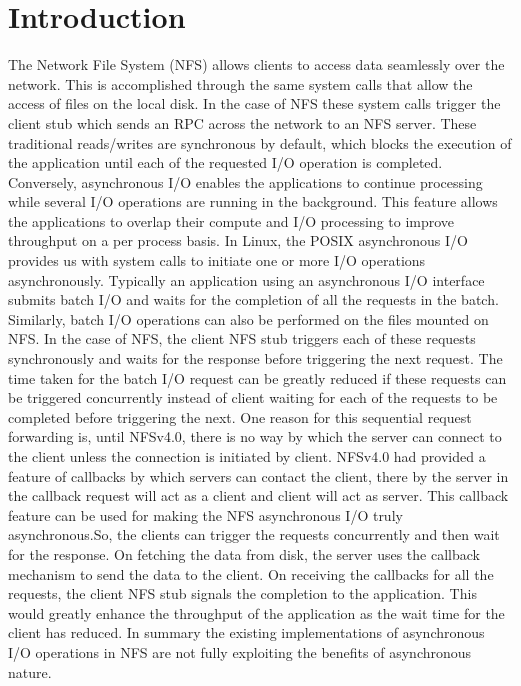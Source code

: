 \section{Introduction}
\label{intro}

The Network File System (NFS) allows clients to access data seamlessly over the network. This is accomplished through the same system calls that allow the access of files on the local disk. In the case of NFS these system calls trigger the client stub which sends an RPC across the network to an NFS server. These traditional reads/writes are synchronous by default, which blocks the execution of the application until each of the requested I/O operation is completed. Conversely, asynchronous I/O enables the applications to continue processing while several I/O operations are running in the background. This feature allows the applications to overlap their compute and I/O processing to improve throughput on a per process basis. In Linux, the POSIX asynchronous I/O \cite{aio} provides us with system calls to initiate one or more I/O operations asynchronously. Typically an application using an asynchronous I/O interface submits batch I/O and waits for the completion of all the requests in the batch. Similarly, batch I/O operations can also be performed on the files mounted on NFS. In the case of NFS, the client NFS stub triggers each of these requests synchronously and waits for the response before triggering the next request. The time taken for the batch I/O request can be greatly reduced if these requests can be triggered concurrently instead of client waiting for each of the requests to be completed before triggering the next. One reason for this sequential request forwarding is, until NFSv4.0, there is no way by which the server can connect to the client unless the connection is initiated by client. NFSv4.0 had provided a feature of callbacks by which servers can contact the client, there by the server in the callback request will act as a client and client will act as server. This callback feature can be used for making the NFS asynchronous I/O truly asynchronous.So, the clients can trigger the requests concurrently and then wait for the response. On fetching the data from disk, the server uses the callback mechanism to send the data to the client. On receiving the callbacks for all the requests, the client NFS stub signals the completion  to the  application. This would greatly enhance the throughput of the application as the wait time for the client has reduced. In summary the existing implementations of asynchronous I/O operations in NFS are not fully exploiting the benefits of asynchronous nature.

